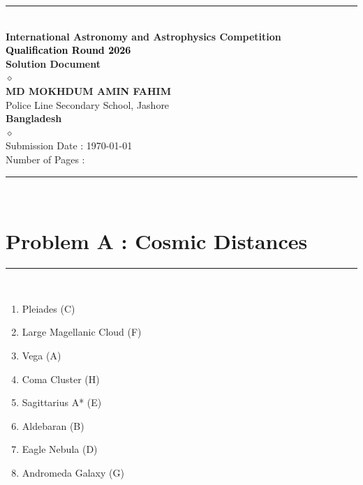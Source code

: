 \documentclass{article}
\begin{document}
\begin{center}
	\textcolor{cyan}{\rule{0.75\textwidth}{0.6pt}}\\
    \vspace{1cm}
    {\Huge \bfseries \textcolor{blue!70!black}{International Astronomy and Astrophysics Competition}}\\
    \vspace{1cm}
    {\Large \bfseries \textcolor{black}{Qualification Round 2026}}\\
    \vspace{1cm}
    {\large \bfseries \textcolor{NavyBlue}{Solution Document}}\\
    \vspace{1.5cm}
    {\color{Cyan} \Huge $\diamond$}\\
    \vspace{1.5cm}
    {\Large \bfseries \textcolor{blue!90!black}{MD MOKHDUM AMIN FAHIM}}\\
    \vspace{0.5cm}
    {\Large Police Line Secondary School, Jashore}\\
    \vspace{0.5cm}
    {\Large \bfseries \textcolor{NavyBlue}{Bangladesh}}\\
    \vspace{1.5cm}
    {\color{Cyan} \Huge $\diamond$}\\
    \vspace{1.5cm}
    {\large Submission Date : \today }\\
    \vspace{0.5cm}
    {\large Number of Pages : \pageref{LastPage} }\\
    \vspace{1cm}
    \textcolor{Cyan}{\rule{0.75\textwidth}{0.6pt}}\\
\end{center}

\thispagestyle{empty}
\newpage
\setcounter{page}{1}

\section*{Problem A : Cosmic Distances}
\vspace{-10pt} \textcolor{cyan}{\rule{7.7cm}{0.6pt}}\\
\begin{enumerate}
    \item Pleiades (C)
    \item Large Magellanic Cloud (F)
    \item Vega (A)
    \item Coma Cluster (H)
    \item Sagittarius A* (E)
    \item Aldebaran (B)
    \item Eagle Nebula (D)
    \item Andromeda Galaxy (G)\\
\end{enumerate}
\end{document}
